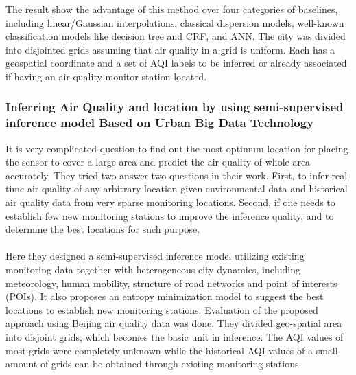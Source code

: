The result show the advantage of this method over four categories of baselines, including linear/Gaussian interpolations, classical dispersion models, well-known classification models like decision tree and CRF, and ANN. The city was divided into disjointed grids assuming that air quality in a grid is uniform. Each has a geospatial coordinate and a set of AQI labels to be inferred or already associated if having an air quality monitor station located.

\subsubsection{Inferring Air Quality and location by using semi-supervised inference model Based on Urban Big Data Technology \cite{22}}
It is very complicated question to find out the most optimum location for placing the sensor to cover a large area and predict the air quality of whole area accurately. They tried two answer two questions in their work. First, to infer real-time air quality of any arbitrary location given environmental data and historical air quality data from very sparse monitoring locations. Second, if one needs to establish few new monitoring stations to improve the inference quality, and to determine the best locations for such purpose.
\\
\\
Here they designed a semi-supervised inference model utilizing existing monitoring data together with heterogeneous city dynamics, including meteorology, human mobility, structure of road networks and point of interests (POIs). It also proposes an entropy minimization model to suggest the best locations to establish new monitoring stations. Evaluation of the proposed approach using Beijing air quality data was done. They divided geo-spatial area into disjoint grids, which becomes the basic unit in inference. The AQI values of most grids were completely unknown while the historical AQI values of a small amount of grids can be obtained through existing monitoring stations.


